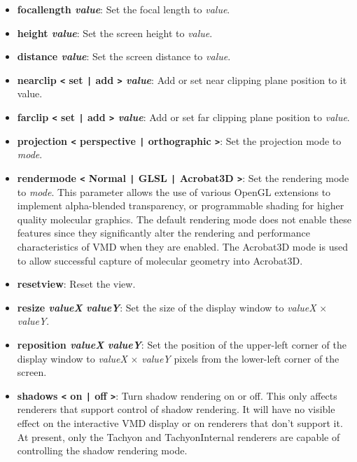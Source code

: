 \begin{itemize}
\item {\bf  focallength {\it value}}: Set the focal length to {\it value}.
\item {\bf  height {\it value}}: Set the screen height to {\it value}.
\item {\bf  distance {\it value}}: Set the screen distance to {\it value}.

\item {\bf  nearclip {\tt <}  set {\tt |} add {\tt >}  {\it value}}: Add or set near clipping plane position to {it value}.
\item {\bf  farclip {\tt <}  set {\tt |} add {\tt >}  {\it value}}: Add or set far clipping plane position to {\it value}.

\item {\bf  projection {\tt <} perspective {\tt |} orthographic {\tt >}}: Set the projection mode to {\it mode}.


\item {\bf  rendermode {\tt <} Normal {\tt |} GLSL {\tt |} Acrobat3D {\tt >}}:
   Set the rendering mode to {\it mode}.
   This parameter allows the use of various OpenGL extensions to implement 
   alpha-blended transparency, or programmable shading for higher quality
   molecular graphics.  The default rendering mode does not enable these 
   features since they significantly alter the rendering and performance
   characteristics of VMD when they are enabled.  The Acrobat3D mode is
   used to allow successful capture of molecular geometry into Acrobat3D.

\item {\bf  resetview}: Reset the view. 

\item {\bf  resize {\it valueX} {\it valueY}}: Set the size of the
    display window to {\it valueX} $\times$ {\it valueY}.

\item {\bf  reposition {\it valueX} {\it valueY}}: Set the position of
    the upper-left corner of the display window to {\it valueX} $\times$
    {\it valueY} pixels from the lower-left corner of the screen.

\item {\bf  shadows {\tt <}  on {\tt |} off {\tt >}}: 
    Turn shadow rendering on or off.  This only affects renderers
    that support control of shadow rendering.  It will have no visible effect
    on the interactive VMD display or on renderers that don't support it.
    At present, only the Tachyon and TachyonInternal renderers are capable
    of controlling the shadow rendering mode.


\end{itemize}

